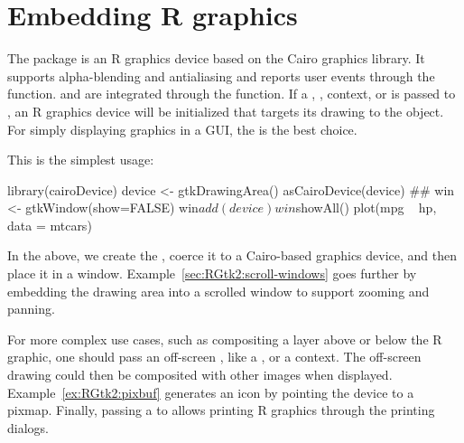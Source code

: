 \section{Embedding R graphics}
\label{sec:gtk-widget-graphics}


The package  is an R graphics device based on the
Cairo graphics library.  It supports alpha-blending and antialiasing
and reports user events through the 
function.  and  are integrated through the
 function. If a ,
,  context, or 
is passed to , an R graphics device will be
initialized that targets its drawing to the object. For simply
displaying graphics in a GUI, the  is the best
choice. 

This is the simplest usage:
\begin{Schunk}
\begin{Sinput}
 library(cairoDevice)
 device <- gtkDrawingArea()
 asCairoDevice(device)
 ##
 win <- gtkWindow(show=FALSE)
 win$add(device)
 win$showAll()
 plot(mpg ~ hp, data = mtcars)
\end{Sinput}
\end{Schunk}
%
In the above, we create the , coerce it to a
Cairo-based graphics device, and then place it in a
window. Example~\ref{sec:RGtk2:scroll-windows} goes further by
embedding the drawing area into a scrolled window to support zooming
and panning.

For more complex use cases, such as compositing a layer above or below
the R graphic, one should pass an off-screen , like
a , or a  context. The off-screen
drawing could then be composited with other images when
displayed. Example~\ref{ex:RGtk2:pixbuf} generates an icon by pointing
the device to a pixmap. Finally, passing a  to
 allows printing R graphics through the \GTK\/
printing dialogs.

